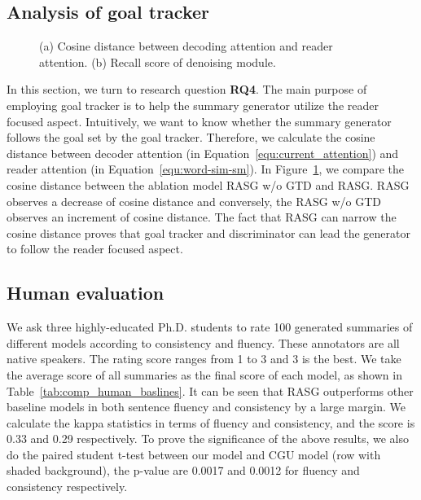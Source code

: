 \documentclass[letterpaper]{article} \usepackage{aaai19}  \usepackage{times}  \usepackage{helvet}  \usepackage{courier}
\begin{document}
\subsection{Analysis of goal tracker}



\begin{figure} 
  \centering 
  \caption{(a) Cosine distance between decoding attention and reader attention. (b) Recall score of denoising module.} 
  \label{fig:subfig} \end{figure}

In this section, we turn to research question \textbf{RQ4}.
The main purpose of employing goal tracker is to help the summary generator utilize the reader focused aspect.
Intuitively, we want to know whether the summary generator follows the goal set by the goal tracker.
Therefore, we calculate the cosine distance between decoder attention  (in Equation~\ref{equ:current_attention}) and reader attention  (in Equation~\ref{equ:word-sim-sm}).
In Figure~\ref{fig:subfig}, we compare the cosine distance between the ablation model RASG w/o GTD and RASG.
RASG observes a decrease of cosine distance and conversely, the RASG w/o GTD observes an increment of cosine distance.
The fact that RASG can narrow the cosine distance proves that goal tracker and discriminator can lead the generator to follow the reader focused aspect.

\subsection{Human evaluation}

We ask three highly-educated Ph.D. students to rate 100 generated summaries of different models according to consistency and fluency.
These annotators are all native speakers.
The rating score ranges from 1 to 3 and 3 is the best.
We take the average score of all summaries as the final score of each model, as shown in Table~\ref{tab:comp_human_baslines}.
It can be seen that RASG outperforms other baseline models in both sentence fluency and consistency by a large margin.
We calculate the kappa statistics in terms of fluency and consistency, and the score is 0.33 and 0.29 respectively.
To prove the significance of the above results, we also do the paired student t-test between our model and CGU model (row with shaded background), the p-value are 0.0017 and 0.0012 for fluency and consistency respectively.
\end{document}
